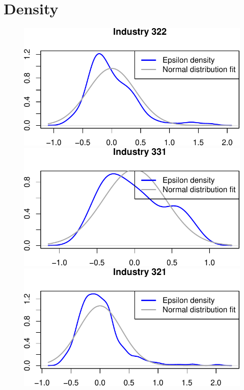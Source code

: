 \documentclass[
  12pt]{article}
\theoremstyle{definition}
\theoremstyle{remark}
\begin{document}
\section{Density}\label{density}

\begin{figure}

\begin{minipage}{\linewidth}

\includegraphics{Tax-Prod_files/figure-pdf/unnamed-chunk-63-1.pdf}

\includegraphics{Tax-Prod_files/figure-pdf/unnamed-chunk-63-2.pdf}

\includegraphics{Tax-Prod_files/figure-pdf/unnamed-chunk-63-3.pdf}


\end{minipage}
\end{figure}
\end{document}
